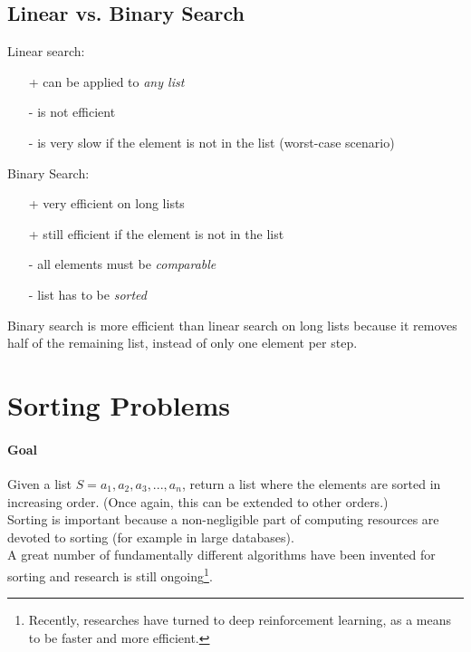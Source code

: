 \documentclass[10pt,a4paper]{book}
\begin{document}
\subsection{Linear vs. Binary Search}
\begin{multicols}{2}
Linear search:
\begin{itemize}
\item[+]can be applied to \textit{any list}
\item[-]is not efficient
\item[-]is very slow if the element is not in the list (worst-case scenario)\\
$\ $
\end{itemize}
\columnbreak
Binary Search:
\begin{itemize}
\item[+]very efficient on long lists
\item[+]still efficient if the element is not in the list
\item[-]all elements must be \textit{comparable}
\item[-]list has to be \textit{sorted}
\end{itemize}
\end{multicols}
Binary search is more efficient than linear search on long lists because it removes half of the remaining list, instead of only one element per step.

\section{Sorting Problems}
\paragraph*{Goal}
Given a list $S = a_{1},a_{2},a_{3},...,a_{n}$, return a list where the elements are sorted in increasing order. (Once again, this can be extended to other orders.)\\
Sorting is important because a non-negligible part of computing resources are devoted to sorting (for example in large databases). \\
A great number of fundamentally different algorithms have been invented for sorting and research is still ongoing\footnote{Recently, researches have turned to deep reinforcement learning, as a means to be faster and more efficient.}.
\end{document}
